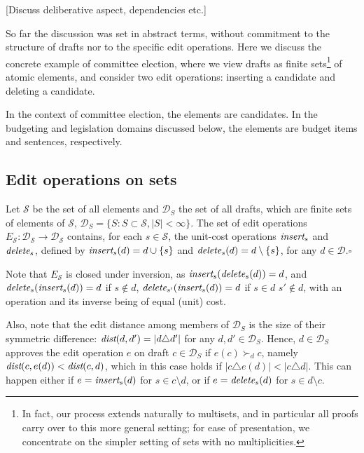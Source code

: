 \documentclass{llncs}
\newcommand{\qqed}{\hfill$\square$}
\newcommand{\calD}{\mathcal{D}}
\newcommand{\calS}{\mathcal{S}}
\newcommand{\iinsert}[1]{\emph{insert}_{#1}}
\newcommand{\ddelete}[1]{\emph{delete}_{#1}}
\newcommand{\prefers}[1]{\succ_{#1}}
\newcommand{\dist}{\emph{dist}}
\begin{document}
[Discuss deliberative aspect, dependencies etc.]




So far the discussion was set in abstract terms, without commitment to the structure of drafts nor to the specific edit operations.
Here we discuss the concrete example of committee election, where we view drafts as finite sets\footnote{In fact, our process extends naturally to multisets, and in particular all proofs carry over to this more general setting; for ease of presentation, we concentrate on the simpler setting of sets with no multiplicities.} of atomic elements, and consider two edit operations: inserting a candidate and deleting a candidate. 

In the context of committee election, the elements are candidates. In the budgeting and legislation domains discussed below, the elements are budget items and sentences, respectively.

\subsection{Edit operations on sets}

\begin{definition}
Let $\calS$ be the set of all elements and $\calD_S$ the set of all drafts, which are finite sets of elements of $\calS$,   $\calD_S = \{S: S \subset \calS, |S| < \infty\}$. The set of edit operations $E_\calS: \calD_\calS \rightarrow \calD_\calS$ contains, for each $s \in \calS$, the unit-cost operations $\iinsert{s}$ and $\ddelete{s}$, defined by
$\iinsert{s}(d) = d \cup \{s\}$ and $\ddelete{s}(d) = d \setminus \{s\}$, for any $d \in \calD$.\qqed
\end{definition}

Note that $E_\calS$ is closed under inversion, as $\iinsert{s}(\ddelete{s}(d)) = d$, and $\ddelete{s}(\iinsert{s}(d)) = d$ if $s \notin d$, $\ddelete{{s'}}(\iinsert{s}(d)) = d$ if $s \in d$ $s' \notin d$, with an operation and its inverse being of equal (unit) cost.  

Also, note that the edit distance among members of $\calD_S$ is the size of their symmetric difference:  $\dist(d,d') = |d \triangle d'|$ for any $d, d' \in \calD_S$. Hence,
$d \in \calD_S$ approves the edit operation $e$ on draft $c \in \calD_S$ if $e(c) \prefers{d} c$, namely  $\dist(c, e(d)) < \dist(c, d)$, which in this case holds if $|c \triangle e(d)| < |c \triangle d|$.  This can happen either if $e = \iinsert{s}(d)$ for $s  \in c \setminus d$, or if $e = \ddelete{s}(d)$ for $s  \in d \setminus c$. 
\end{document}
